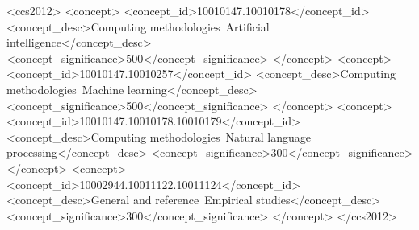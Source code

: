 \begin{CCSXML}
<ccs2012>
   <concept>
       <concept_id>10010147.10010178</concept_id>
       <concept_desc>Computing methodologies~Artificial intelligence</concept_desc>
       <concept_significance>500</concept_significance>
       </concept>
   <concept>
       <concept_id>10010147.10010257</concept_id>
       <concept_desc>Computing methodologies~Machine learning</concept_desc>
       <concept_significance>500</concept_significance>
       </concept>
   <concept>
       <concept_id>10010147.10010178.10010179</concept_id>
       <concept_desc>Computing methodologies~Natural language processing</concept_desc>
       <concept_significance>300</concept_significance>
       </concept>
   <concept>
       <concept_id>10002944.10011122.10011124</concept_id>
       <concept_desc>General and reference~Empirical studies</concept_desc>
       <concept_significance>300</concept_significance>
       </concept>
 </ccs2012>
\end{CCSXML}



\maketitle
